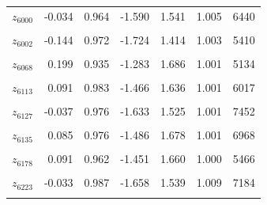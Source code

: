 \begin{longtable}{lrrrrrr}
$z_{6000}$ & -0.034 & 0.964 & -1.590 & 1.541 & 1.005 & 6440\\
\cellcolor{gray!10}{$z_{6001}$} & \cellcolor{gray!10}{0.236} & \cellcolor{gray!10}{0.959} & \cellcolor{gray!10}{-1.281} & \cellcolor{gray!10}{1.757} & \cellcolor{gray!10}{1.001} & \cellcolor{gray!10}{5575}\\
$z_{6002}$ & -0.144 & 0.972 & -1.724 & 1.414 & 1.003 & 5410\\
\cellcolor{gray!10}{$z_{6055}$} & \cellcolor{gray!10}{0.446} & \cellcolor{gray!10}{0.985} & \cellcolor{gray!10}{-1.143} & \cellcolor{gray!10}{2.010} & \cellcolor{gray!10}{1.002} & \cellcolor{gray!10}{2693}\\
$z_{6068}$ & 0.199 & 0.935 & -1.283 & 1.686 & 1.001 & 5134\\
\cellcolor{gray!10}{$z_{6112}$} & \cellcolor{gray!10}{0.097} & \cellcolor{gray!10}{0.970} & \cellcolor{gray!10}{-1.451} & \cellcolor{gray!10}{1.637} & \cellcolor{gray!10}{1.002} & \cellcolor{gray!10}{7103}\\
$z_{6113}$ & 0.091 & 0.983 & -1.466 & 1.636 & 1.001 & 6017\\
\cellcolor{gray!10}{$z_{6115}$} & \cellcolor{gray!10}{0.142} & \cellcolor{gray!10}{0.971} & \cellcolor{gray!10}{-1.419} & \cellcolor{gray!10}{1.736} & \cellcolor{gray!10}{1.003} & \cellcolor{gray!10}{7143}\\
$z_{6127}$ & -0.037 & 0.976 & -1.633 & 1.525 & 1.001 & 7452\\
\cellcolor{gray!10}{$z_{6132}$} & \cellcolor{gray!10}{0.061} & \cellcolor{gray!10}{0.990} & \cellcolor{gray!10}{-1.520} & \cellcolor{gray!10}{1.639} & \cellcolor{gray!10}{1.002} & \cellcolor{gray!10}{6277}\\
$z_{6135}$ & 0.085 & 0.976 & -1.486 & 1.678 & 1.001 & 6968\\
\cellcolor{gray!10}{$z_{6139}$} & \cellcolor{gray!10}{-0.303} & \cellcolor{gray!10}{0.980} & \cellcolor{gray!10}{-1.798} & \cellcolor{gray!10}{1.272} & \cellcolor{gray!10}{1.002} & \cellcolor{gray!10}{4782}\\
$z_{6178}$ & 0.091 & 0.962 & -1.451 & 1.660 & 1.000 & 5466\\
\cellcolor{gray!10}{$z_{6183}$} & \cellcolor{gray!10}{0.041} & \cellcolor{gray!10}{0.984} & \cellcolor{gray!10}{-1.562} & \cellcolor{gray!10}{1.644} & \cellcolor{gray!10}{1.002} & \cellcolor{gray!10}{6325}\\
$z_{6223}$ & -0.033 & 0.987 & -1.658 & 1.539 & 1.009 & 7184\\
\cellcolor{gray!10}{$z_{6237}$} & \cellcolor{gray!10}{-0.111} & \cellcolor{gray!10}{0.988} & \cellcolor{gray!10}{-1.666} & \cellcolor{gray!10}{1.432} & \cellcolor{gray!10}{1.004} & \cellcolor{gray!10}{7915}\\

\end{longtable}
